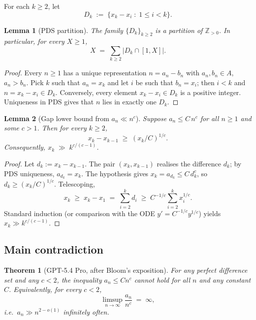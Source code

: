 \documentclass[11pt]{article}
\newtheorem{theorem}{Theorem}
\newtheorem{lemma}{Lemma}
\begin{document}
For each $k \geq 2$, let
\[
   D_k \;:=\; \{ x_k - x_i \;:\; 1 \leq i < k \}.
\]

\begin{lemma}[PDS partition]\label{lem:partition}
The family $\{D_k\}_{k \geq 2}$ is a partition of $\mathbb{Z}_{> 0}$.
In particular, for every $X \geq 1$,
\[
   X \;=\; \sum_{k \geq 2} |D_k \cap [1, X]|.
\]
\end{lemma}

\begin{proof}
Every $n \geq 1$ has a unique representation $n = a_n - b_n$ with
$a_n, b_n \in A$, $a_n > b_n$. Pick $k$ such that $a_n = x_k$ and let
$i$ be such that $b_n = x_i$; then $i < k$ and $n = x_k - x_i \in D_k$.
Conversely, every element $x_k - x_i \in D_k$ is a positive integer.
Uniqueness in PDS gives that $n$ lies in exactly one $D_k$.
\end{proof}

\begin{lemma}[Gap lower bound from $a_n \ll n^c$]\label{lem:gap}
Suppose $a_n \leq C\, n^c$ for all $n \geq 1$ and some $c > 1$. Then for
every $k \geq 2$,
\[
   x_k - x_{k-1} \;\geq\; (x_k / C)^{1/c}.
\]
Consequently, $x_k \;\gg\; k^{c/(c-1)}$.
\end{lemma}

\begin{proof}
Let $d_k := x_k - x_{k-1}$. The pair $(x_k, x_{k-1})$ realises the
difference $d_k$; by PDS uniqueness, $a_{d_k} = x_k$. The hypothesis
gives $x_k = a_{d_k} \leq C\, d_k^c$, so $d_k \geq (x_k/C)^{1/c}$.
Telescoping,
\[
   x_k \;\geq\; x_k - x_1
       \;=\; \sum_{i=2}^{k} d_i
       \;\geq\; C^{-1/c} \sum_{i=2}^{k} x_i^{1/c}.
\]
Standard induction (or comparison with the ODE
$y' = C^{-1/c} y^{1/c}$) yields $x_k \gg k^{c/(c-1)}$.
\end{proof}

\subsection{Main contradiction}

\begin{theorem}[GPT-5.4 Pro, after Bloom's exposition]\label{thm:n2io}
For any perfect difference set and any $c < 2$, the inequality
$a_n \leq C n^c$ \emph{cannot} hold for all $n$ and any constant $C$.
Equivalently, for every $c < 2$,
\[
   \limsup_{n \to \infty} \frac{a_n}{n^c} \;=\; \infty,
\]
i.e.\ $a_n \gg n^{2-o(1)}$ infinitely often.
\end{theorem}
\end{document}
